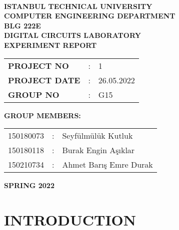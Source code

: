 \documentclass[pdftex,12pt,a4paper]{article}
\begin{document}
\begin{titlepage}
\begin{center}
\textbf{}\\
\textbf{\Large{ISTANBUL TECHNICAL UNIVERSITY}}\\
\vspace{0.5cm}
\textbf{\Large{COMPUTER ENGINEERING DEPARTMENT}}\\
\vspace{2cm}
\textbf{\Large{BLG 222E\\ DIGITAL CIRCUITS LABORATORY\\ EXPERIMENT REPORT}}\\
\vspace{2.8cm}
\begin{table}[ht]
\centering
\Large{
\begin{tabular}{lcl}
\textbf{PROJECT NO}  & : & 1 \\
\textbf{PROJECT DATE}  & : & 26.05.2022 \\
\textbf{GROUP NO}  & : & G15 \\
\end{tabular}}
\end{table}
\vspace{1cm}
\textbf{\Large{GROUP MEMBERS:}}\\
\begin{table}[ht]
\centering
\Large{
\begin{tabular}{rcl}
150180073  & : & Seyfülmülük Kutluk \\
150180118  & : & Burak Engin  Aşıklar \\
150210734  & : & Ahmet Barış Emre Durak \\
\end{tabular}}
\end{table}
\vspace{2.8cm}
\textbf{\Large{SPRING 2022}}

\end{center}

\end{titlepage}

\thispagestyle{empty}
\setcounter{tocdepth}{4}
\tableofcontents
\clearpage

\setcounter{page}{1}

\section{INTRODUCTION}
\end{document}
